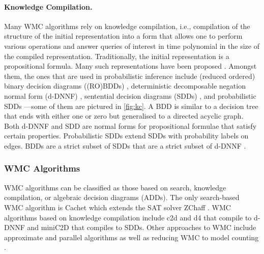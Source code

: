 \documentclass{article}
\begin{document}
\paragraph{Knowledge Compilation.}
Many WMC algorithms rely on knowledge compilation, i.e., compilation of the
structure of the initial representation into a form that allows one to perform
various operations and answer queries of interest in time polynomial in the size
of the compiled representation. Traditionally, the initial representation is a
propositional formula. Many such representations have been proposed
\cite{DBLP:journals/jair/DarwicheM02}. Amongst them, the ones that are used in
probabilistic inference include (reduced ordered) binary decision diagrams
((RO)BDDs) \cite{DBLP:journals/tc/Bryant86}, deterministic decomposable negation
normal form (d-DNNF) \cite{DBLP:journals/jancl/Darwiche01}, sentential decision
diagrams (SDDs) \cite{DBLP:conf/ijcai/Darwiche11}, and probabilistic SDDs
\cite{DBLP:conf/kr/KisaBCD14}---some of them are pictured in \cref{fig:kc}. A
BDD is similar to a decision tree that ends with either one or zero but
generalised to a directed acyclic graph. Both d-DNNF and SDD are normal forms
for propositional formulae that satisfy certain properties. Probabilistic SDDs
extend SDDs with probability labels on edges. BDDs are a strict subset of SDDs
that are a strict subset of d-DNNF \cite{DBLP:conf/ijcai/Darwiche11}.


\subsubsection{WMC Algorithms}

WMC algorithms can be classified as those based on search, knowledge
compilation, or algebraic decision diagrams (ADDs). The only search-based WMC
algorithm is Cachet
\cite{DBLP:conf/sat/SangBBKP04,DBLP:conf/sat/SangBK05,DBLP:conf/aaai/SangBK05}
which extends the SAT solver ZChaff
\cite{DBLP:conf/dac/MoskewiczMZZM01,DBLP:conf/iccad/ZhangMMM01}. WMC algorithms
based on knowledge compilation include c2d \cite{DBLP:conf/ecai/Darwiche04} and
d4 \cite{DBLP:conf/ijcai/LagniezM17} that compile to d-DNNF and miniC2D
\cite{DBLP:conf/ijcai/OztokD15} that compiles to SDDs. Other approaches to WMC
include approximate \cite{DBLP:conf/aaai/RenkensKBR14} and parallel algorithms
\cite{DBLP:conf/pgm/DalLL18} as well as reducing WMC to model counting
\cite{DBLP:conf/ijcai/ChakrabortyFMV15}.
\end{document}
